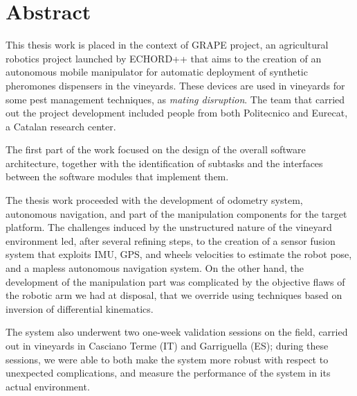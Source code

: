
\begingroup
\let\clearpage\relax
\let\cleardoublepage\relax
\let\cleardoublepage\relax

\chapter*{Abstract}
This thesis work is placed in the context of \ac{GRAPE} project, an agricultural robotics project launched by \ac{ECHORD++} that aims to the creation of an autonomous mobile manipulator for automatic deployment of synthetic pheromones dispensers in the vineyards. These devices are used in vineyards for some pest management techniques, as \textit{mating disruption}. The team that carried out the project development included people from both  Politecnico and Eurecat, a Catalan research center.
\par The first part of the work focused on the design of the overall software architecture, together with the identification of subtasks and the interfaces between the software modules that implement them. 
\par The thesis work proceeded with the development of odometry system, autonomous navigation, and part of the manipulation components for the target platform. The challenges induced by the unstructured nature of the vineyard environment led, after several refining steps, to the creation of a sensor fusion system that exploits \ac{IMU}, GPS, and wheels velocities to estimate the robot pose, and a mapless autonomous navigation system. On the other hand, the development of the manipulation part was complicated by the objective flaws of the robotic arm we had at disposal, that we override using techniques based on inversion of differential kinematics.
\par The system also underwent two one-week validation sessions on the field, carried out in vineyards in Casciano Terme (IT) and Garriguella (ES); during these sessions, we were able to  both make the system more robust with respect to unexpected complications, and measure the performance of the system in its actual environment.

\vfill
\newpage
{}
